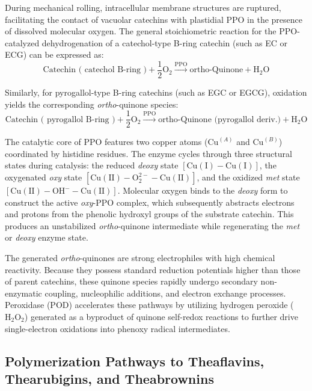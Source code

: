 \documentclass{article}
\begin{document}
During mechanical rolling, intracellular membrane structures are ruptured, facilitating the contact of vacuolar catechins with plastidial PPO in the presence of dissolved molecular oxygen. The general stoichiometric reaction for the PPO-catalyzed dehydrogenation of a catechol-type B-ring catechin (such as EC or ECG) can be expressed as:
\begin{equation}
\text{Catechin ( catechol B-ring )} + \frac{1}{2}\text{O}_2 \xrightarrow{\text{PPO}} \text{ortho-Quinone} + \text{H}_2\text{O}
\end{equation}

Similarly, for pyrogallol-type B-ring catechins (such as EGC or EGCG), oxidation yields the corresponding \textit{ortho}-quinone species:
\begin{equation}
\text{Catechin ( pyrogallol B-ring )} + \frac{1}{2}\text{O}_2 \xrightarrow{\text{PPO}} \text{ortho-Quinone (pyrogallol deriv.)} + \text{H}_2\text{O}
\end{equation}

The catalytic core of PPO features two copper atoms ($\text{Cu}^{(A)}$ and $\text{Cu}^{(B)}$) coordinated by histidine residues. The enzyme cycles through three structural states during catalysis: the reduced \textit{deoxy} state $[\text{Cu}(\text{I})-\text{Cu}(\text{I})]$, the oxygenated \textit{oxy} state $[\text{Cu}(\text{II})-\text{O}_2^{2-}-\text{Cu}(\text{II})]$, and the oxidized \textit{met} state $[\text{Cu}(\text{II})-\text{OH}^--\text{Cu}(\text{II})]$. Molecular oxygen binds to the \textit{deoxy} form to construct the active \textit{oxy}-PPO complex, which subsequently abstracts electrons and protons from the phenolic hydroxyl groups of the substrate catechin. This produces an unstabilized \textit{ortho}-quinone intermediate while regenerating the \textit{met} or \textit{deoxy} enzyme state.

The generated \textit{ortho}-quinones are strong electrophiles with high chemical reactivity. Because they possess standard reduction potentials higher than those of parent catechins, these quinone species rapidly undergo secondary non-enzymatic coupling, nucleophilic additions, and electron exchange processes. Peroxidase (POD) accelerates these pathways by utilizing hydrogen peroxide ($\text{H}_2\text{O}_2$) generated as a byproduct of quinone self-redox reactions to further drive single-electron oxidations into phenoxy radical intermediates.

\subsection{Polymerization Pathways to Theaflavins, Thearubigins, and Theabrownins}
\end{document}
